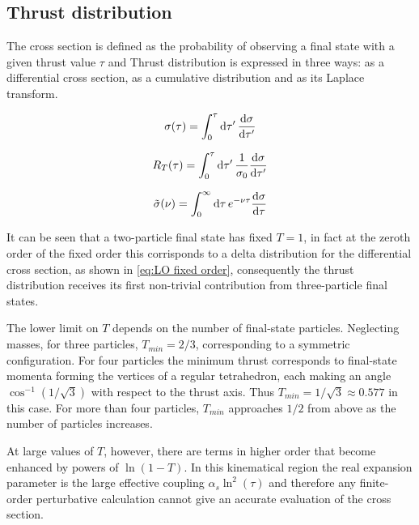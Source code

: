 \documentclass[../main.tex]{subfiles}
\begin{document}
\subsection{Thrust distribution} \label{subsec:Thrust_distribution}

The cross section is defined as the probability of observing a final state with a given thrust value $\tau$ and Thrust distribution is expressed in three ways:
as a differential cross section, as a cumulative distribution and as its Laplace transform.

\begin{equation}\label{eq:differential_cross_section}
    \sigma(\tau) = \int^\tau_0 \dd{\tau'} \dv{\sigma}{\tau'}
\end{equation}

\begin{equation}\label{eq:cumulative_distribution}
    R_T(\tau) = \int^\tau_0 \dd{\tau'} \frac{1}{\sigma_0}\dv{\sigma}{\tau'}
\end{equation}

\begin{equation}\label{eq:Laplace transform distribution}
    \Tilde{\sigma}(\nu) = \int^\infty_0 \dd{\tau} e^{-\nu \tau} \dv{\sigma}{\tau}
\end{equation}

It can be seen that a two-particle final state has fixed $T = 1$, in fact at the zeroth order of the fixed order this corrisponds to a delta distribution 
for the differential cross section, as shown in  \cref{eq:LO fixed order}, consequently the thrust distribution receives its first non-trivial contribution 
from three-particle final states.

The lower limit on $T$ depends on the number of final-state particles.
Neglecting masses, for three particles, $T_{min} = 2/3$, corresponding to a symmetric configuration.
For four particles the minimum thrust corresponds to final-state momenta forming the vertices of a regular tetrahedron,
each making an angle $\cos^{-1}(1/\sqrt{3})$ with respect to the thrust axis. Thus $T_{min} = 1/\sqrt{3} \approx 0.577$ in this
case. For more than four particles, $T_{min}$ approaches $1/2$ from above as the number of particles increases.

At large values of $T$, however, there are terms in higher order that become enhanced by powers of $\ln(1 - T)$.
In this kinematical region the real expansion parameter is the large effective coupling $\alpha_s \ln^2(\tau)$ and therefore
any finite-order perturbative calculation cannot give an accurate evaluation of the cross section.
\end{document}
